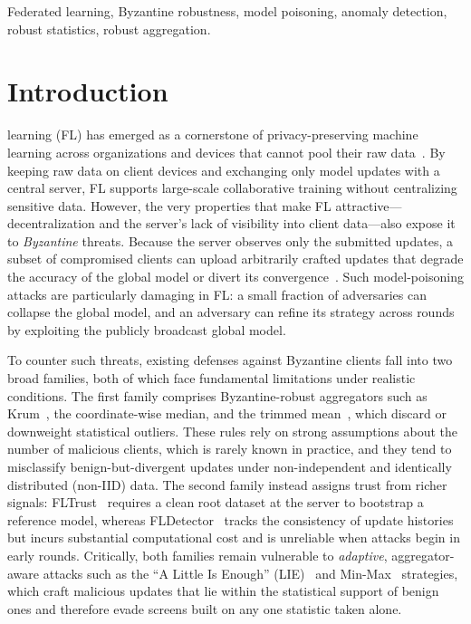 \documentclass[journal]{IEEEtran}
\begin{document}
\begin{IEEEkeywords}
Federated learning, Byzantine robustness, model poisoning, anomaly detection, robust statistics, robust aggregation.
\end{IEEEkeywords}

\section{Introduction}
\label{sec:introduction}


 learning (FL) has emerged as a cornerstone of privacy-preserving machine learning across organizations and devices that cannot pool their raw data~\cite{sandeepa2025federated}. By keeping raw data on client devices and exchanging only model updates with a central server, FL supports large-scale collaborative training without centralizing sensitive data. However, the very properties that make FL attractive---decentralization and the server's lack of visibility into client data---also expose it to \emph{Byzantine} threats. Because the server observes only the submitted updates, a subset of compromised clients can upload arbitrarily crafted updates that degrade the accuracy of the global model or divert its convergence~\cite{baruch2019little, fang2020local, shejwalkar2021manipulating}. Such model-poisoning attacks are particularly damaging in FL: a small fraction of adversaries can collapse the global model, and an adversary can refine its strategy across rounds by exploiting the publicly broadcast global model.

To counter such threats, existing defenses against Byzantine clients fall into two broad families, both of which face fundamental limitations under realistic conditions. The first family comprises Byzantine-robust aggregators such as Krum~\cite{blanchard2017machine}, the coordinate-wise median, and the trimmed mean~\cite{yin2018byzantine}, which discard or downweight statistical outliers. These rules rely on strong assumptions about the number of malicious clients, which is rarely known in practice, and they tend to misclassify benign-but-divergent updates under non-independent and identically distributed (non-IID) data. The second family instead assigns trust from richer signals: FLTrust~\cite{cao2020fltrust} requires a clean root dataset at the server to bootstrap a reference model, whereas FLDetector~\cite{zhang2022fldetector} tracks the consistency of update histories but incurs substantial computational cost and is unreliable when attacks begin in early rounds. Critically, both families remain vulnerable to \emph{adaptive}, aggregator-aware attacks such as the ``A Little Is Enough'' (LIE)~\cite{baruch2019little} and Min-Max~\cite{shejwalkar2021manipulating} strategies, which craft malicious updates that lie within the statistical support of benign ones and therefore evade screens built on any one statistic taken alone.
\end{document}
